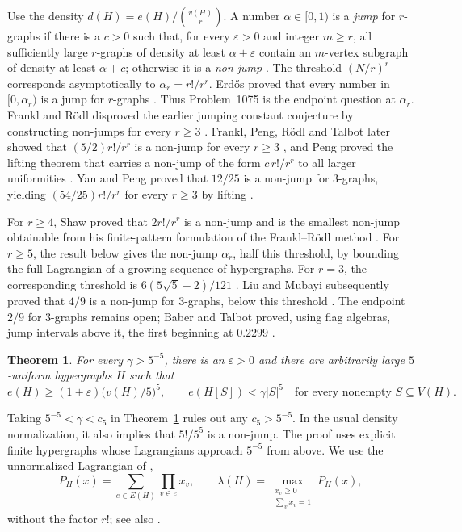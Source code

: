 \documentclass[11pt]{article}
\newtheorem{theorem}{Theorem}
\numberwithin{equation}{section}
\begin{document}
Use the density \(d(H)=e(H)/\binom{v(H)}r\). A number
\(\alpha\in[0,1)\) is a \emph{jump} for \(r\)-graphs if there is a
\(c>0\) such that, for every \(\varepsilon>0\) and integer \(m\ge r\),
all sufficiently large \(r\)-graphs of density at least
\(\alpha+\varepsilon\) contain an \(m\)-vertex subgraph of density
at least \(\alpha+c\); otherwise it is a \emph{non-jump}
\cite{FranklRodl84}. The threshold \((N/r)^r\) corresponds asymptotically to
\(\alpha_r=r!/r^r\). Erd\H{o}s proved that every number in
\([0,\alpha_r)\) is a jump for \(r\)-graphs \cite{Erdos71}. Thus
Problem~1075 is the endpoint question at \(\alpha_r\).
Frankl and R\"odl disproved the earlier jumping constant conjecture by
constructing non-jumps for every \(r\ge3\)
\cite[Theorem~1.2]{FranklRodl84}.
Frankl, Peng, R\"odl and Talbot later showed that
\((5/2)r!/r^r\) is a non-jump for every \(r\ge3\) \cite{FPRT07},
and Peng proved the lifting theorem that carries a non-jump of the form
\(c\,r!/r^r\) to all larger uniformities \cite[Theorem~1]{Peng09}. Yan and Peng
proved that \(12/25\) is a non-jump for \(3\)-graphs, yielding
\((54/25)r!/r^r\) for every \(r\ge3\) by lifting \cite{YanPeng23}.

For \(r\ge4\), Shaw proved that \(2r!/r^r\) is a non-jump and is
the smallest non-jump obtainable from his finite-pattern formulation of
the Frankl--R\"odl method \cite[Theorems~4.3 and~4.4(ii)]{Shaw26}.
For \(r\ge5\), the result below gives the non-jump \(\alpha_r\),
half this threshold, by bounding the full Lagrangian of a growing
sequence of hypergraphs.
For \(r=3\), the corresponding threshold is
\(6(5\sqrt5-2)/121\) \cite[Theorem~4.4(i)]{Shaw26}.
Liu and Mubayi subsequently proved that \(4/9\) is a non-jump for
\(3\)-graphs, below this threshold \cite{LiuMubayi26}. The endpoint
\(2/9\) for \(3\)-graphs remains open; Baber and Talbot proved, using
flag algebras, jump intervals above it, the first beginning at \(0.2299\)
\cite{BaberTalbot11}.

\begin{theorem}\label{thm:main}
For every \(\gamma>5^{-5}\), there is an \(\varepsilon>0\) and
there are arbitrarily large \(5\)-uniform hypergraphs \(H\) such that
\[
 e(H)\ge(1+\varepsilon)\bigl(v(H)/5\bigr)^{5},
 \qquad
 e(H[S])<\gamma|S|^{5}
 \quad\text{for every nonempty }S\subseteq V(H).
\]
\end{theorem}

Taking \(5^{-5}<\gamma<c_{5}\) in Theorem~\ref{thm:main}
rules out any \(c_{5}>5^{-5}\). In the usual density normalization,
it also implies that \(5!/5^{5}\) is a non-jump. The proof uses
explicit finite hypergraphs whose Lagrangians approach \(5^{-5}\)
from above. We use the unnormalized Lagrangian of
\cite[Section~2]{FranklRodl84},
\begin{equation}\label{eq:lagrangian}
 P_H(x)=\sum_{e\in E(H)}\prod_{v\in e}x_v,
 \qquad
 \lambda(H)=\max_{\substack{x_v\ge0\\\sum_vx_v=1}}P_H(x),
\end{equation}
without the factor \(r!\); see also \cite{MotzkinStraus65,Keevash11}.
\end{document}
